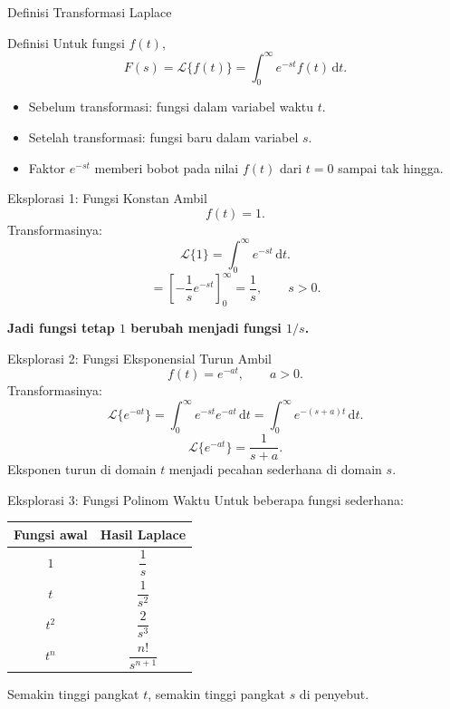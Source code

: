 \documentclass[aspectratio=169,11pt]{beamer}
\newcommand{\lap}[1]{\mathcal{L}\{#1\}}
\newcommand{\dd}{\,\mathrm{d}}
\begin{document}
\begin{frame}{Definisi Transformasi Laplace}
\begin{block}{Definisi}
Untuk fungsi $f(t)$,
\[
\boxed{F(s)=\lap{f(t)}=\int_0^\infty e^{-st}f(t)\dd t.}
\]
\end{block}
\begin{itemize}
  \item Sebelum transformasi: fungsi dalam variabel waktu $t$.
  \item Setelah transformasi: fungsi baru dalam variabel $s$.
  \item Faktor $e^{-st}$ memberi bobot pada nilai $f(t)$ dari $t=0$ sampai tak hingga.
\end{itemize}
\end{frame}

\begin{frame}{Eksplorasi 1: Fungsi Konstan}
Ambil
\[
 f(t)=1.
\]
Transformasinya:
\[
\lap{1}=\int_0^\infty e^{-st}\dd t.
\]
\[
=\left[-\frac{1}{s}e^{-st}\right]_0^\infty=\frac{1}{s}, \qquad s>0.
\]
\begin{center}
\textbf{Jadi fungsi tetap $1$ berubah menjadi fungsi $1/s$.}
\end{center}
\end{frame}

\begin{frame}{Eksplorasi 2: Fungsi Eksponensial Turun}
Ambil
\[
 f(t)=e^{-at}, \qquad a>0.
\]
Transformasinya:
\[
\lap{e^{-at}}=\int_0^\infty e^{-st}e^{-at}\dd t
=\int_0^\infty e^{-(s+a)t}\dd t.
\]
\[
\boxed{\lap{e^{-at}}=\frac{1}{s+a}.}
\]
\vspace{0.1cm}
Eksponen turun di domain $t$ menjadi pecahan sederhana di domain $s$.
\end{frame}

\begin{frame}{Eksplorasi 3: Fungsi Polinom Waktu}
Untuk beberapa fungsi sederhana:
\begin{center}
\begin{tabular}{c c}
\toprule
\textbf{Fungsi awal} & \textbf{Hasil Laplace} \\
\midrule
$1$ & $\dfrac{1}{s}$ \\
$t$ & $\dfrac{1}{s^2}$ \\
$t^2$ & $\dfrac{2}{s^3}$ \\
$t^n$ & $\dfrac{n!}{s^{n+1}}$ \\
\bottomrule
\end{tabular}
\end{center}
\vspace{0.2cm}
Semakin tinggi pangkat $t$, semakin tinggi pangkat $s$ di penyebut.
\end{frame}
\end{document}
